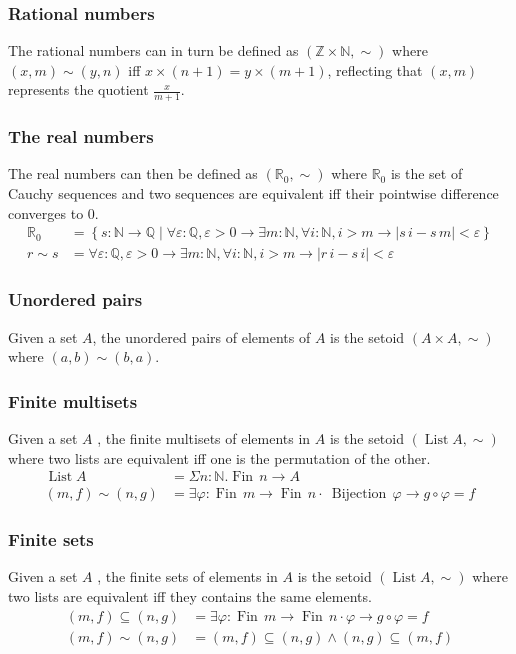 \documentclass[envcountsame]{llncs}
\newcommand{\N}{\mathbb{N}}
\newcommand{\Q}{\mathbb{Q}}
\newcommand{\R}{\mathbb{R}}
\newcommand{\Z}{\mathbb{Z}}
\providecommand{\set}  [1]{\left\{#1\right\}}
\DeclareMathOperator{\List}{List}
\DeclareMathOperator{\Fin}{Fin}
\begin{document}
\subsubsection*{Rational numbers}
The rational numbers can in turn be defined as $(\Z\times\N,\sim)$ where $(x,m)\sim(y,n)$ if{f} $x\times(n+1)=y\times(m+1)$, reflecting that $(x,m)$ represents the quotient $\frac {x}{m+1}$.


\subsubsection*{The real numbers}

The real numbers can then be defined as $(\R_0,\sim)$ where $\R_0$ is the set of Cauchy sequences and two sequences are equivalent if{f} their pointwise difference converges to $0$.
\begin{align*}
\R_0&=\set{s : \N\to\Q \mid \forall\varepsilon :\Q,\varepsilon>0\to\exists m:\N, \forall i:\N, i>m\to |s\,i - s\, m|<\varepsilon}\\
r\sim s &= \forall\varepsilon :\Q,\varepsilon>0\to\exists m:\N, \forall i:\N, i>m\to |r\,i - s\,i|<\varepsilon
\end{align*}

\subsubsection*{Unordered pairs}
Given a set $A$, the unordered pairs of elements of $A$ is the setoid $(A\times A,\sim)$ where
$(a,b)\sim(b,a)$.

\subsubsection*{Finite multisets}
Given a set $A$ , the finite multisets of elements in $A$ is the setoid $(\List A,\sim)$ where two lists are equivalent if{f} one is the permutation of the other.
\begin{align*}
\List A &= \Sigma n:\N.\Fin\,n\to A\\
(m,f)\sim(n,g) &= \exists \varphi : \Fin\,m \to \Fin\,n \cdot\ \mathop{Bijection}\,\varphi \to g\circ\varphi = f
\end{align*}

\subsubsection*{Finite sets}
Given a set $A$ , the finite sets of elements in $A$ is the setoid $(\List A,\sim)$ where two lists are equivalent if{f} they contains the same elements.
\begin{align*}
(m,f)\subseteq(n,g) &= \exists \varphi : \Fin\,m \to \Fin\,n \cdot \varphi \to g\circ\varphi = f  \\
(m,f)\sim(n,g)&= (m,f)\subseteq(n,g) \wedge (n,g)\subseteq(m,f)
\end{align*}
\end{document}
